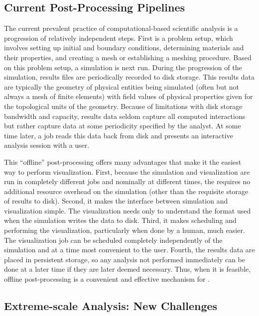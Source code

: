 \subsection{Current Post-Processing Pipelines}

The current prevalent practice of computational-based scientific analysis
is a progression of relatively independent steps.  First is a problem
setup, which involves setting up initial and boundary conditions,
determining materials and their properties, and creating a mesh or
establishing a meshing procedure.  Based on this problem setup, a
simulation is next run.  During the progression of the simulation, results
files are periodically recorded to disk storage.  This results data are
typically the geometry of physical entities being simulated (often but not
always a mesh of finite elements) with field values of physical properties
given for the topological units of the geometry.  Because of limitations
with disk storage bandwidth and capacity, results data seldom capture all
computed interactions but rather capture data at some periodicity specified
by the analyst.  At some time later, a \vda job reads this data back from
disk and presents an interactive analysis session with a user.

This ``offline'' post-processing \vda offers many advantages that make it
the easiest way to perform visualization.  First, because the simulation
and visualization are run in completely different jobs and nominally at
different times, the \vda requires no additional resource overhead on the
simulation (other than the requisite storage of results to disk).  Second,
it makes the interface between simulation and visualization simple.  The
visualization needs only to understand the format used when the simulation
writes the data to disk.  Third, it makes scheduling and performing the
visualization, particularly when done by a human, much easier.  The
visualization job can be scheduled completely independently of the
simulation and at a time most convenient to the user.  Fourth, the results
data are placed in persistent storage, so any analysis not performed
immediately can be done at a later time if they are later deemed necessary.
Thus, when it is feasible, offline post-processing is a convenient and
effective mechanism for \vda.

\subsection{Extreme-scale Analysis: New Challenges}
\label{sec:NewChallenges}

